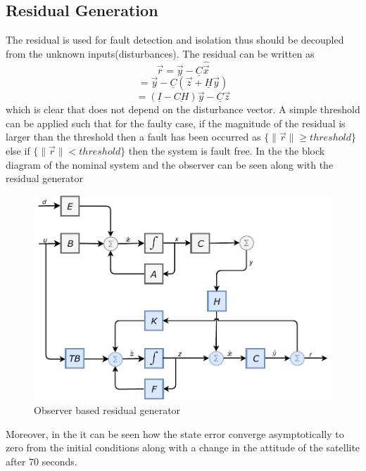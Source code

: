 \subsection{Residual Generation}
The residual is used for fault detection and isolation thus should be decoupled from the unknown inputs(disturbances). The residual can be written as
\begin{equation*}
\vec{r} = \vec{y} - \underline C \hat{\vec{x}} 
\label{errordynamics11}
\end{equation*}
\begin{equation*}
= \vec{y} - \underline C (\vec{z} + \underline{H} \vec{y} ) 
\label{errordynamics12}
\end{equation*}
\begin{equation*}
= (\underline I  -\underline{ CH})\vec{y}   -\underline C \vec{z} 
\label{errordynamics13}
\end{equation*}
which is clear that does not depend on the disturbance vector. A simple threshold can be applied such that for the faulty case, if the magnitude of the residual is larger than the threshold then a fault has been occurred as
$\{\lVert \vec{r}\rVert \geq threshold \}$ else if $\{\lVert \vec{r}\rVert < threshold \}$ then the system is fault free. In the  the block diagram of the nominal system and the observer can be seen along with the residual generator
\begin{figure}[H]
	\centering
	\includegraphics[width=0.7\linewidth]{figures/UIO}
	\caption{Observer based residual generator}
	\label{fig:residualobs}
\end{figure}
Moreover, in the  it can be seen how the state error converge asymptotically to zero from the initial conditions along with a change in the attitude of the satellite after 70 seconds.
